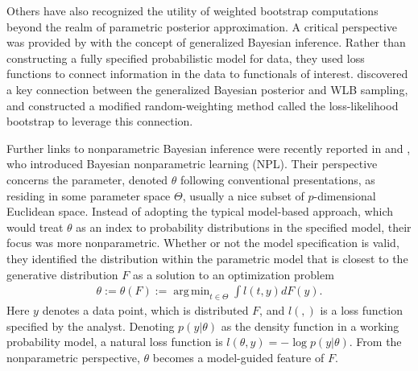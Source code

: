 \documentclass[ejs,authoryear,linksfromyear]{imsart}
\DeclareMathOperator*{\argmin}{arg\,min} %
\numberwithin{equation}{section}
\theoremstyle{plain}
\begin{document}
Others have also recognized the utility of weighted bootstrap computations 
beyond the realm of parametric posterior approximation. A critical perspective was provided by \citet{Bissiri2016JRSSB} with the concept of generalized Bayesian inference. Rather than constructing a fully specified probabilistic model for data, they used loss functions to connect information in the data to functionals of interest. \citet{Lyddon2019Biometrika} discovered a key connection between the generalized Bayesian posterior and WLB sampling, and constructed a
modified random-weighting method called the loss-likelihood bootstrap to leverage this connection. 

Further links to nonparametric Bayesian inference were recently reported in \citet{Lyddon2018NIPS} and \citet{Fong2019ICML}, who introduced Bayesian nonparametric learning (NPL). Their perspective concerns the parameter, denoted $\theta$ following conventional presentations, as residing in some parameter space $\Theta$, usually a nice subset of $p$-dimensional Euclidean space. Instead of adopting the typical model-based approach, which would treat $\theta$ as an index to probability distributions in the specified model, their focus was more nonparametric. Whether or not the model specification is valid, they identified the distribution within the parametric model that is closest to the generative distribution $F$ as a solution to an optimization problem
\begin{eqnarray}
\label{eq:basic}
\theta := \theta(F) := 
\argmin_{t \in \Theta} 
\int l(t, y) dF(y).
\end{eqnarray}
Here $y$ denotes a data point, which is distributed $F$, and $l(,)$ is a loss function specified by the analyst.  Denoting $p(y|\theta)$ as the density function in a working probability model, a natural loss function is $l(\theta,y) = -\log p(y|\theta)$. From the nonparametric perspective,  $\theta$ becomes a model-guided feature of $F$.
\end{document}
